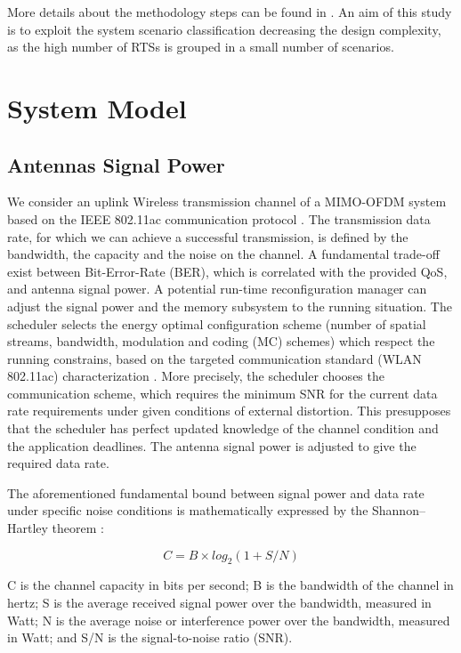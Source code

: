 	More details about the methodology steps can be found in \cite{17}. An aim of this study is to exploit the system scenario classification decreasing the design complexity, as the high number of RTSs is grouped in a small number of scenarios. 

\section{System Model}

\subsection{Antennas Signal Power }

We consider an uplink Wireless transmission channel of a MIMO-OFDM system based on the IEEE 802.11ac communication protocol \cite{4}. The transmission data rate, for which we can achieve a successful transmission, is defined by the bandwidth, the capacity and the noise on the channel. A fundamental trade-off exist between Bit-Error-Rate (BER), which is correlated with the provided QoS, and antenna signal power. A potential run-time reconfiguration manager can adjust the signal power and the memory subsystem to the running situation. The scheduler selects the energy optimal configuration scheme (number of spatial streams, bandwidth, modulation and coding (MC) schemes) which respect the running constrains, based on the targeted communication standard (WLAN 802.11ac) characterization \cite{4}. More precisely, the scheduler chooses the communication scheme, which requires the minimum SNR for the current data rate requirements under given conditions of external distortion. This presupposes that the scheduler has perfect updated knowledge of the channel condition and the application deadlines. The antenna signal power is adjusted to give the required data rate. 

	The aforementioned fundamental bound between signal power and data rate under specific noise conditions is mathematically expressed by the Shannon–Hartley theorem \cite{18}:

\begin{equation}
C = B \times log_{2}(1+ S/N)
\end{equation}

C is the channel capacity in bits per second; B is the bandwidth of the channel in hertz; S is the average received signal power over the bandwidth, measured in Watt; N is the average noise or interference power over the bandwidth, measured in Watt; and S/N is the signal-to-noise ratio (SNR). 

